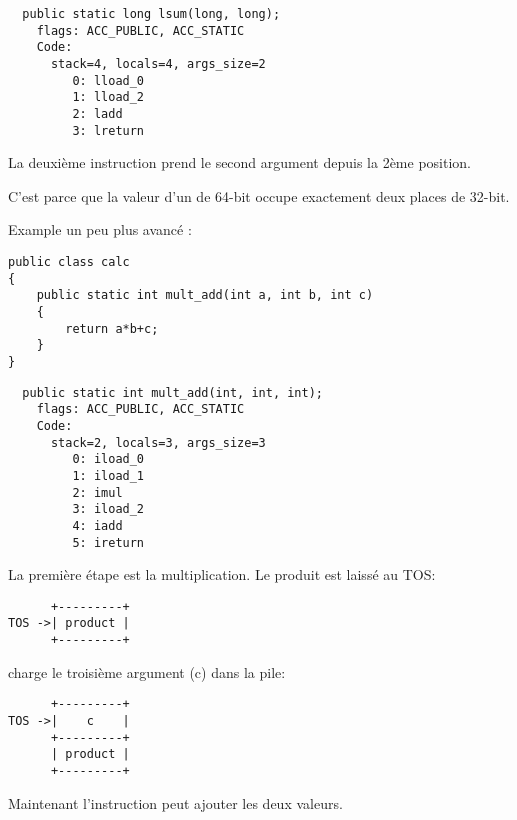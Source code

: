 \begin{lstlisting}
  public static long lsum(long, long);
    flags: ACC_PUBLIC, ACC_STATIC
    Code:
      stack=4, locals=4, args_size=2
         0: lload_0       
         1: lload_2       
         2: ladd          
         3: lreturn       
\end{lstlisting}

La deuxième instruction  prend le second argument depuis la 2ème position.

C'est parce que la valeur d'un  de 64-bit occupe exactement deux places de 32-bit.


Example un peu plus avancé :


\begin{lstlisting}[style=customjava]
public class calc
{
	public static int mult_add(int a, int b, int c)
	{
		return a*b+c;
	}
}
\end{lstlisting}

\begin{lstlisting}
  public static int mult_add(int, int, int);
    flags: ACC_PUBLIC, ACC_STATIC
    Code:
      stack=2, locals=3, args_size=3
         0: iload_0       
         1: iload_1       
         2: imul          
         3: iload_2       
         4: iadd          
         5: ireturn       
\end{lstlisting}

La première étape est la multiplication. Le produit est laissé au \ac{TOS}:


\begin{lstlisting}
      +---------+
TOS ->| product |
      +---------+
\end{lstlisting}

 charge le troisième argument (c) dans la pile:

\begin{lstlisting}
      +---------+
TOS ->|    c    |
      +---------+
      | product |
      +---------+
\end{lstlisting}

Maintenant l'instruction  peut ajouter les deux valeurs.

